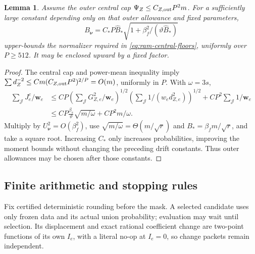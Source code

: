 \documentclass[11pt]{article}
\newtheorem{lemma}[theorem]{Lemma}
\theoremstyle{remark}
\newcommand{\ww}{\mathbf w}
\newcommand{\nnu}{\boldsymbol{\nu}}
\begin{document}
\begin{lemma}
\label{lem:ram-global-normalizer}
Assume the outer central cap $\Psi_Z\le C_{Z,\rm out}P^2m$.
For a sufficiently large constant depending only on that outer allowance and
fixed parameters,
\[
 B_{\nnu}=C_*P\widehat B_*\sqrt{1+\beta_f^2/(\vartheta\widehat B_*)}
\]
upper-bounds the normalizer required in \eqref{eq:ram-central-floors}, uniformly
over $P\ge512$.
It may be enclosed upward by a fixed factor.
\end{lemma} \begin{proof} The central cap and power-mean inequality imply $\sum
d_Z^{-2}\le C m(C_{Z,\rm out}P^2)^{2/P}=O(m)$, uniformly in $P$.
With $\omega=3s$,
\begin{align*}
\sum_{\mathcal J}J^c_e/\ww_e
 &\le CP\left(\sum_{\mathcal J}G_{Z,e}^2/\ww_e\right)^{1/2}
      \left(\sum_{\mathcal J}1/(w_ed_{Z,e}^2)\right)^{1/2}
      +CP^2\sum_{\mathcal J}1/\ww_e\\
 &\le CP\frac{\beta_s}{\vartheta}\sqrt{m/\omega}+CP^2m/\omega.
\end{align*}
Multiply by $U_{\nnu}^2=O(\beta_f^2)$, use $\sqrt{m/\omega}=\Theta(m/\sqrt r)$ and
$B_*=\beta_fm/\sqrt r$, and take a square root.
Increasing $C_*$ only increases probabilities, improving the moment bounds
without changing the preceding drift constants.
Thus outer allowances may be chosen after those constants.
\end{proof}

\subsection{Finite arithmetic and stopping rules}

Fix certified deterministic rounding before the mask.
A selected candidate uses only frozen data and its actual union probability;
evaluation may wait until selection.
Its displacement and exact rational coefficient change are two-point functions
of its own $I_e$, with a literal no-op at $I_e=0$, so change packets remain
independent.
\end{document}
